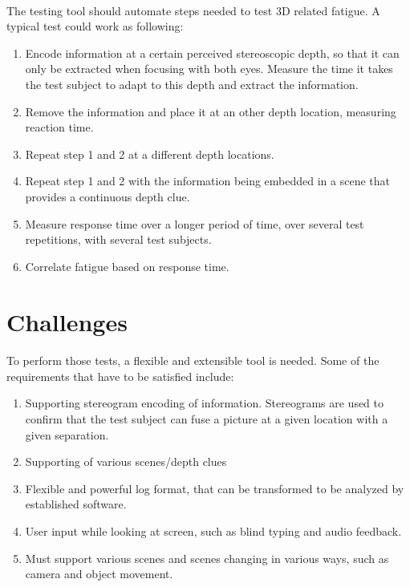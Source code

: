 \documentclass[11pt]{scrartcl}
\begin{document}
\begin{multicols}{2}
\paragraph{}
The testing tool should automate steps needed to test 3D related fatigue. A typical test could work as following:

\begin{enumerate}
\item Encode information at a certain perceived stereoscopic depth, so that it can only be extracted when focusing with both eyes. Measure the time it takes the test subject to adapt to this depth and extract the information.
\item Remove the information and place it at an other depth location, measuring reaction time.
\item Repeat step 1 and 2 at a different depth locations.
\item Repeat step 1 and 2 with the information being embedded in a scene that provides a continuous depth clue.
\item Measure response time over a longer period of time, over several test repetitions, with several test subjects.
\item Correlate fatigue based on response time.
\end{enumerate}

\section{Challenges}
\paragraph{}
To perform those tests, a flexible and extensible tool is needed. Some of the requirements that have to be satisfied include:

\begin{enumerate}
\item Supporting stereogram encoding of information. Stereograms are used to confirm that the test subject can fuse a picture at a given location with a given separation.
\item Supporting of various scenes/depth clues
\item Flexible and powerful log format, that can be transformed to be analyzed by established software.
\item User input while looking at screen, such as blind typing and audio feedback.
\item Must support various scenes and scenes changing in various ways, such as camera and object movement.
\end{enumerate}


\end{multicols}
\end{document}
